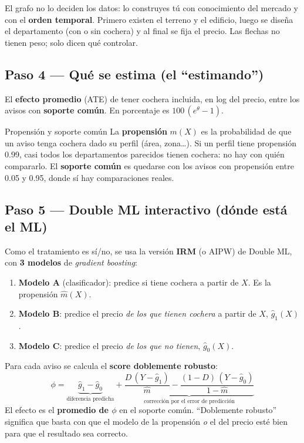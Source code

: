 \documentclass[11pt,a4paper]{article}
\begin{document}
El grafo no lo deciden los datos: lo construyes tú con conocimiento del mercado y con el \textbf{orden temporal}. Primero existen el terreno y el edificio, luego se diseña el departamento (con o sin cochera) y al final se fija el precio. Las flechas no tienen peso; solo dicen qué controlar.

\subsection{Paso 4 --- Qué se estima (el ``estimando'')}

El \textbf{efecto promedio} (ATE) de tener cochera incluida, en log del precio, entre los avisos con \textbf{soporte común}. En porcentaje es $100\,(e^\theta-1)$.

\begin{idea}{Propensión y soporte común}
La \textbf{propensión} $m(X)$ es la probabilidad de que un aviso tenga cochera dado su perfil (área, zona\ldots). Si un perfil tiene propensión 0.99, casi todos los departamentos parecidos tienen cochera: no hay con quién compararlo. El \textbf{soporte común} es quedarse con los avisos con propensión entre 0.05 y 0.95, donde sí hay comparaciones reales.
\end{idea}

\subsection{Paso 5 --- Double ML interactivo (dónde está el ML)}

Como el tratamiento es sí/no, se usa la versión \textbf{IRM} (o AIPW) de Double ML, con \textbf{3 modelos} de \textit{gradient boosting}:
\begin{enumerate}
\item \textbf{Modelo A} (clasificador): predice si tiene cochera a partir de $X$. Es la propensión $\hat m(X)$.
\item \textbf{Modelo B}: predice el precio \emph{de los que tienen cochera} a partir de $X$, $\hat g_1(X)$.
\item \textbf{Modelo C}: predice el precio \emph{de los que no tienen}, $\hat g_0(X)$.
\end{enumerate}
Para cada aviso se calcula el \textbf{score doblemente robusto}:
\[
\phi=\underbrace{\hat g_1-\hat g_0}_{\text{diferencia predicha}}+\underbrace{\frac{D\,(Y-\hat g_1)}{\hat m}-\frac{(1-D)\,(Y-\hat g_0)}{1-\hat m}}_{\text{corrección por el error de predicción}}
\]
El efecto es el \textbf{promedio de $\phi$} en el soporte común. ``Doblemente robusto'' significa que basta con que el modelo de la propensión \emph{o} el del precio esté bien para que el resultado sea correcto.
\end{document}
